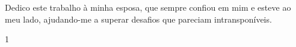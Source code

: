 \maketitle

\begin{itadedication}
Dedico este trabalho à minha esposa, que sempre confiou em mim e esteve ao meu lado, ajudando-me a superar desafios que pareciam intransponíveis.
\end{itadedication}


\begin{itathanks}

\end{itathanks}

\thispagestyle{empty}
\ifhyperref{}\fi
\begin{flushright}
\begin{spacing}{1}
\mbox{}\vfill

\end{spacing}
\end{flushright}

\begin{abstract}
\noindent

\end{abstract}

\begin{englishabstract}
\noindent

\end{englishabstract}

\listoffigures %

\listoftables %

\printnoidxglossary[type=\acronymtype,
    title=\listofabbreviationsname,
    toctitle=\listofabbreviationsname,
    sort=standard,
    nonumberlist]
    
\printnoidxglossary[
    title=\listofsymbolsname,
    toctitle=\listofsymbolsname,
    sort=use,   %
    nonumberlist]

\tableofcontents
